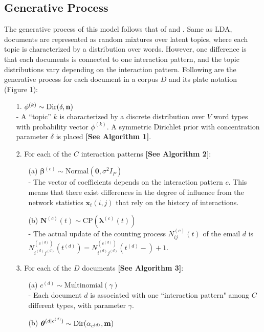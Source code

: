 \documentclass[a4paper]{article}
\begin{document}
\subsection{Generative Process}
The generative process of this model follows that of \cite{Blei2003} and \cite{rosen2004author}. Same as LDA, documents are represented as random mixtures over latent topics, where each topic is characterized by a distribution over words. However, one difference is that each documents is connected to one interaction pattern, and the topic distributions vary depending on the interaction pattern. Following are the generative process for each document in a corpus $D$ and its plate notation (Figure 1):
\begin{itemize}
	\item[1.] {$\phi^{(k)} \sim \mbox{Dir}(\delta, \bf n)$}\\
	- A “topic” $k$ is characterized by a discrete distribution over $V$ word types with probability vector $\phi^{(k)}$. A symmetric Dirichlet prior with concentration parameter $\delta$ is placed \textbf{[See Algorithm 1]}.
\item[2.] For each of the $C$ interaction patterns \textbf{[See Algorithm 2]}:
\begin{itemize}
	\item[(a)] $\boldsymbol{\beta}^{(c)}\sim \mbox{Normal}(\textbf{0}, \sigma^2I_P)$\\ 
	- The vector of coefficients depends on the interaction pattern $c$. This means that there exist differences in the degree of influence from the network statistics $\boldsymbol{x}_t(i, j)$ that rely on the history of interactions.
\item[(b)] $\boldsymbol{N}^{(c)}(t) \sim \mbox{CP}(\boldsymbol{\lambda}^{(c)}(t))$\\
- The actual update of the counting process $N^{(c)}_{ij}(t)$ of the email $d$ is  $N^{(c^{(d)})}_{i^{(d)}j^{(d)}}(t^{(d)})=N^{(c^{(d)})}_{i^{(d)}j^{(d)}}(t^{(d)}-)+1$.
\end{itemize}
\item[3.] For each of the $D$ documents \textbf{[See Algorithm 3]}:
\begin{itemize}
	\item[(a)] $c^{(d)}\sim \mbox{Multinomial}(\gamma)$\\
	- Each document $d$ is associated with one ``interaction pattern" among $C$ different types, with parameter $\gamma$.
	\item[(b)] $\boldsymbol{\theta}^{(d|c^{(d)})}\sim \mbox{Dir}(\alpha_{c^{(d)}}, \bf m)$\\

\end{itemize}
\end{itemize}
\end{document}
